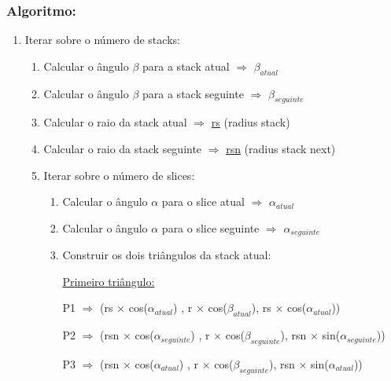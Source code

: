 \documentclass[a4paper]{article}
\begin{document}
\subsubsection{Algoritmo:}

\ttfamily
\begin{enumerate}
  \item Iterar sobre o número de stacks:
  \begin{enumerate}
    \item Calcular o ângulo $\beta$ para a stack atual $\Rightarrow$ \underline{$\beta_{atual}$}
    \item Calcular o ângulo $\beta$ para a stack seguinte $\Rightarrow$ \underline{$\beta_{seguinte}$}
    \item Calcular o raio da stack atual $\Rightarrow$ \underline{rs} (radius stack)
    \item Calcular o raio da stack seguinte $\Rightarrow$ \underline{rsn} (radius stack next)

    \item Iterar sobre o número de slices:
    \begin{enumerate}
      \item Calcular o ângulo $\alpha$ para o slice atual $\Rightarrow$ \underline{$\alpha_{atual}$}
      \item Calcular o ângulo $\alpha$ para o slice seguinte $\Rightarrow$ \underline{$\alpha_{seguinte}$}
      \item Construir os dois triângulos da stack atual:

      \vspace{0.5cm}

      \underline{Primeiro triângulo:}

      \vspace{0.5cm}

          \hspace{0.0cm} P1 $\Rightarrow$ (rs $\times$ cos($\alpha_{atual}$) , r $\times$ cos($\beta_{atual}$), rs $\times$ cos($\alpha_{atual}$))

      \vspace{0.2cm}

          \hspace{-0.5cm} P2 $\Rightarrow$ (rsn $\times$ cos($\alpha_{seguinte}$) , r $\times$ cos($\beta_{seguinte}$), rsn $\times$ sin($\alpha_{seguinte}$))

      \vspace{0.2cm}

          \hspace{0.0cm} P3 $\Rightarrow$ (rsn $\times$ cos($\alpha_{atual}$) , r $\times$ cos($\beta_{seguinte}$), rsn $\times$ sin($\alpha_{atual}$))


\end{enumerate}
\end{enumerate}
\end{enumerate}
\end{document}
